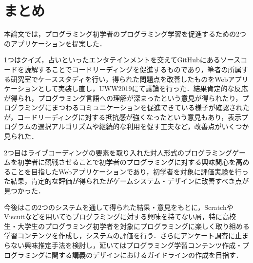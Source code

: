 \section{まとめ}

本論文では，プログラミング初学者のプログラミング学習を促進するための2つのアプリケーションを提案した．

1つはクイズ，占いといったエンタテインメントを交えてGitHubにあるソースコードを読解することでコードリーディングを促進するものであり，筆者の所属する研究室でケーススタディを行い，得られた問題点を改善したものをWebアプリケーションとして実装し直し，UWW2019にて議論を行った．結果肯定的な反応が得られ，プログラミング言語への理解が深まったという意見が得られたり，プログラミングにまつわるコミュニケーションを促進できている様子が確認されたが，コードリーディングに対する抵抗感が強くなったという意見もあり，表示プログラムの選択アルゴリズムや継続的な利用を促す工夫など，改善点がいくつか見られた．

2つ目はライブコーディングの要素を取り入れた対人形式のプログラミングゲームを初学者に観戦させることで初学者のプログラミングに対する興味関心を高めることを目指したWebアプリケーションであり，初学者を対象に評価実験を行った結果，肯定的な評価が得られたがゲームシステム・デザインに改善すべき点が見つかった．

今後はこの2つのシステムを通して得られた結果・意見をもとに，ScratchやViscuitなどを用いてもプログラミングに対する興味を持てない層，特に高校生・大学生のプログラミング初学者を対象にプログラミングに楽しく取り組める学習コンテンツを作成し，システムの評価を行う．さらにアンケート調査に止まらない興味推定手法を検討し，延いてはプログラミング学習コンテンツ作成・プログラミングに関する講義のデザインにおけるガイドラインの作成を目指す．